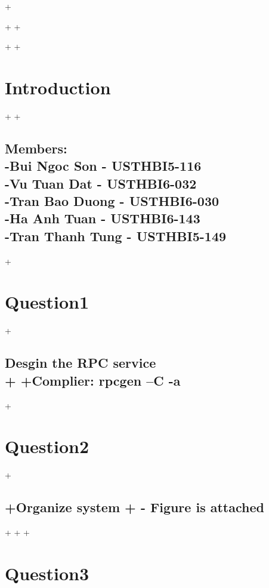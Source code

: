 +\documentclass{article}
\begin{document}
 +
 +\maketitle
 +
 +\section{Introduction}
 +
 +\subsection{Members:\\-Bui Ngoc Son - USTHBI5-116\\-Vu Tuan Dat - USTHBI6-032\\-Tran Bao Duong - USTHBI6-030\\-Ha Anh Tuan - USTHBI6-143\\-Tran Thanh Tung - USTHBI5-149}
 +\section{Question1}
 +\subsection{ Desgin the RPC service\\
 +
 +Complier: rpcgen –C -a  }
 +\section{Question2}
 +\subsection{
 +Organize system
 + - Figure is attached}
 + 
 + 
 + \section{Question3}
\end{document}
